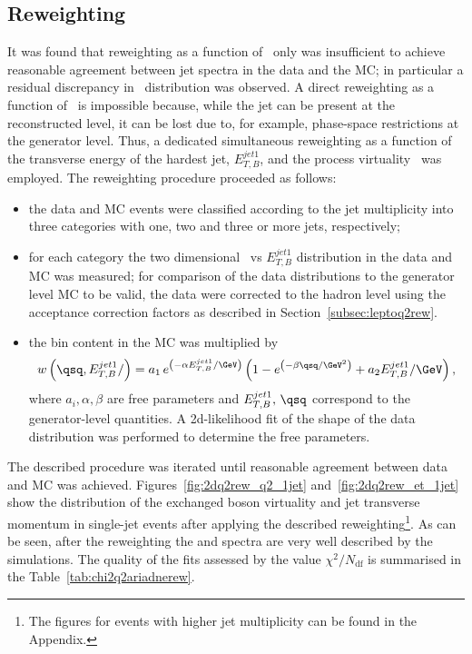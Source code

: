 \subsection{\ariadne Reweighting}
\label{subsec:ariadneq2rew}
It was found that reweighting as a function of \qsq~only was insufficient to achieve reasonable agreement between jet spectra in the data and the \ariadne MC; in particular a residual discrepancy in \etjetb~distribution was observed. A direct reweighting as a function of \etjetb~is impossible because, while the jet can be present at the reconstructed level, it can be lost due to, for example, phase-space restrictions at the generator level. Thus, a dedicated simultaneous re\-wei\-ghting as a function of the transverse energy of the hardest jet, $E_{T,B}^{jet1}$, and the process virtuality \qsq~was employed. The reweighting procedure proceeded as follows:
\begin{itemize}
	\item the data and MC events were classified according to the jet multiplicity into three categories with one, two and three or more jets, respectively;
	\item for each category the two dimensional \qsq~vs $E_{T,B}^{jet1}$ distribution in the data and MC was measured; for comparison of the data distributions to the generator level MC to be valid, the data were corrected to the hadron level using the acceptance correction factors as described in Section~\ref{subsec:leptoq2rew}.
	\item the bin content in the MC was multiplied by 
	\begin{equation}
		w\left( \qsq, E_{T,B}^{jet1}/ \right)=a_1\,e^{\left( -\alpha E_{T,B}^{jet1}/\GeV\right) }\left(1- e^{\left( -\beta\qsq/\GeV^2\right) } + a_2 E_{T,B}^{jet1}/\GeV \right),
		\end{equation}
where $a_i, \alpha, \beta$ are free parameters and $E_{T,B}^{jet1},\,\qsq$ correspond to the ge\-ne\-ra\-tor-level quantities. A 2d-likelihood fit of the shape of the data distribution was performed to determine the free parameters.
\end{itemize}
The described procedure was iterated until reasonable agreement between data and MC was achieved. Figures~\ref{fig:2dq2rew_q2_1jet} and~\ref{fig:2dq2rew_et_1jet} show the distribution of the exchanged boson virtuality and jet transverse momentum in single-jet events after applying the described reweighting\footnote{The figures for events with higher jet multiplicity can be found in the Appendix.}. As can be seen, after the reweighting the \qsq and \etjetb spectra are very well described by the simulations. The quality of the fits assessed by the value  $\chi^2/N_\text{df}$ is summarised in the Table~\ref{tab:chi2q2ariadnerew}.
